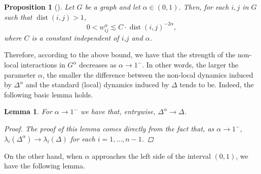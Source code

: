 \documentclass[a4paper,12pt]{article}
\newtheorem{lemma}{Lemma}
\newtheorem{proposition}{Proposition}
\DeclareMathOperator{\dist}{dist}
\newcommand{\fL}{\Delta^\alpha}
\newcommand{\fG}{G^\alpha}
\begin{document}
\begin{proposition}[\cite{Schweitzer_2022_decay_bounds_fL}] \label{prop:bound_decay_shweitzer}
Let $G$ be a graph and let $\alpha\in(0,1)$. Then, for each $i,j$ in $G$ such that $\dist(i,j)>1$, 
\begin{equation*}
       0< w_{ij}^\alpha\lesssim C \cdot \dist(i,j)^{-2\alpha},
\end{equation*}
where $C$ is a constant independent of $i$,$j$ and $\alpha$.
\end{proposition}

Therefore, according to the above bound, we have that the strength of the non-local interactions in $\fG$ decreases as $\alpha\rightarrow1^{-}$. 
In other words, the larger the parameter $\alpha$, the smaller the difference between the non-local dynamics induced by $\fL$ and the standard (local) dynamics induced by $\Delta$ tends to be. Indeed, the following basic lemma holds.  

\begin{lemma} \label{lemma:limit_fL_alpha_to_1}
For $\alpha\rightarrow 1^-$ we have that, entrywise, $\fL\rightarrow \Delta$.
\begin{proof}
The proof of this lemma comes directly from the fact that, as $\alpha\rightarrow 1^-$, $\lambda_i(\fL)\rightarrow\lambda_i(\Delta)$  for each $i=1,\dots,n-1$.   
\end{proof}
\end{lemma}

On the other hand, when $\alpha$ approaches the left side of the interval $(0,1)$, we have the following lemma.
\end{document}
